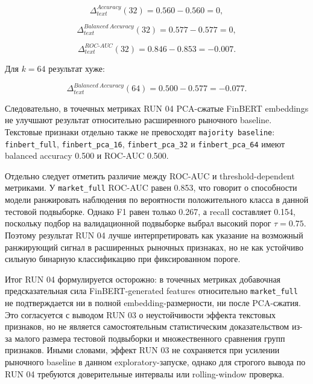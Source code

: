 \[
\Delta_{text}^{Accuracy}(32) = 0.560 - 0.560 = 0,
\]

\[
\Delta_{text}^{Balanced\ Accuracy}(32) = 0.577 - 0.577 = 0,
\]

\[
\Delta_{text}^{ROC\text{-}AUC}(32) = 0.846 - 0.853 = -0.007.
\]

Для $k=64$ результат хуже:

\[
\Delta_{text}^{Balanced\ Accuracy}(64) = 0.500 - 0.577 = -0.077.
\]

Следовательно, в точечных метриках RUN 04 PCA-сжатые FinBERT embeddings не улучшают результат относительно расширенного рыночного baseline. Текстовые признаки отдельно также не превосходят \texttt{majority baseline}: \texttt{finbert\_full}, \texttt{finbert\_pca\_16}, \texttt{finbert\_pca\_32} и \texttt{finbert\_pca\_64} имеют balanced accuracy 0.500 и ROC-AUC 0.500.

Отдельно следует отметить различие между ROC-AUC и threshold-dependent метриками. У \texttt{market\_full} ROC-AUC равен 0.853, что говорит о способности модели ранжировать наблюдения по вероятности положительного класса в данной тестовой подвыборке. Однако F1 равен только 0.267, а recall составляет 0.154, поскольку подбор на валидационной подвыборке выбрал высокий порог $\tau=0.75$. Поэтому результат RUN 04 лучше интерпретировать как указание на возможный ранжирующий сигнал в расширенных рыночных признаках, но не как устойчиво сильную бинарную классификацию при фиксированном пороге.

Итог RUN 04 формулируется осторожно: в точечных метриках добавочная предсказательная сила FinBERT-generated features относительно \texttt{market\_full} не подтверждается ни в полной embedding-размерности, ни после PCA-сжатия. Это согласуется с выводом RUN 03 о неустойчивости эффекта текстовых признаков, но не является самостоятельным статистическим доказательством из-за малого размера тестовой подвыборки и множественного сравнения групп признаков. Иными словами, эффект RUN 03 не сохраняется при усилении рыночного baseline в данном exploratory-запуске, однако для строгого вывода по RUN 04 требуются доверительные интервалы или rolling-window проверка.
